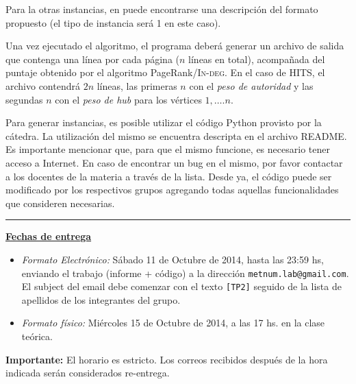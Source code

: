 Para la otras instancias, en \cite{dataset} puede encontrarse una descripci\'on del formato propuesto (el tipo de instancia ser\'a 1 en este caso).

Una vez ejecutado el algoritmo, el programa deber\'a generar un archivo de salida que contenga una l\'inea por cada
p\'agina ($n$ l\'ineas en total), acompa\~nada del puntaje obtenido por el algoritmo PageRank/\textsc{In-deg}. En el caso de HITS, el archivo 
contendr\'a $2n$ l\'ineas, las primeras $n$ con el \emph{peso de autoridad} y las segundas $n$ con el \emph{peso de hub} para los v\'ertices
$1,\dots.n$.

Para generar instancias, es posible utilizar el c\'odigo Python provisto por la c\'atedra. La utilizaci\'on del mismo se
encuentra descripta en el archivo README. Es importante mencionar que, para que el mismo funcione, es
necesario tener acceso a Internet. En caso de encontrar un bug en el mismo, por favor contactar a los docentes de la
materia a trav\'es de la lista. Desde ya, el c\'odigo puede ser modificado por los respectivos grupos agregando todas
aquellas funcionalidades que consideren necesarias.

\vskip 5pt

\hrule

\vskip 5pt


{\bf \underline{Fechas de entrega}}
\begin{itemize}
 \item \emph{Formato Electr\'onico:} S\'abado 11 de Octubre de 2014, hasta las 23:59 hs, enviando el trabajo (informe +
 c\'odigo) a la direcci\'on \verb+metnum.lab@gmail.com+. El subject del email debe comenzar con el texto \verb+[TP2]+
 seguido de la lista de apellidos  de los integrantes del grupo.
 \item \emph{Formato f\'isico:} Mi\'ercoles 15 de Octubre de 2014, a las 17 hs. en la clase te\'orica.
\end{itemize}

\noindent \textbf{Importante:} El horario es estricto. Los correos recibidos despu\'es de la hora indicada ser\'an considerados re-entrega.  



%

